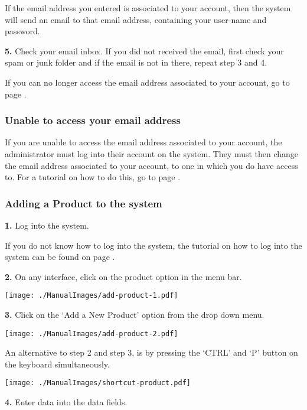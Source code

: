 If the email address you entered is associated to your account, then the system will send an email to that email address, containing your user-name and password.

\textbf{5.} Check your email inbox. If you did not received the email, first check your spam or junk folder and if the email is not in there, repeat step 3 and 4.

If you can no longer access the email address associated to your account, go to page \pageref{fig:Unable to access your email address}.

\pagebreak
\subsubsection{Unable to access your email address}
\label{fig:Unable to access your email address}

If you are unable to access the email address associated to your account, the administrator must log into their account on the system. They must then change the email address associated to your account, to one in which you do have access to. For a tutorial on how to do this, go to page \pageref{fig:Editing an Employee in the system}.

\pagebreak
\subsubsection{Adding a Product to the system}
\label{fig:Adding a Product to the system}

\textbf{1.} Log into the system.

If you do not know how to log into the system, the tutorial on how to log into the system can be found on page \pageref{fig:Logging into the system}.

\textbf{2.} On any interface, click on the product option in the menu bar.

\texttt{[image: ./ManualImages/add-product-1.pdf]}

\textbf{3.} Click on the `Add a New Product' option from the drop down menu.

\texttt{[image: ./ManualImages/add-product-2.pdf]}

An alternative to step 2 and step 3, is by pressing the `CTRL' and `P' button on the keyboard simultaneously.

\texttt{[image: ./ManualImages/shortcut-product.pdf]}

\textbf{4. }Enter data into the data fields.

